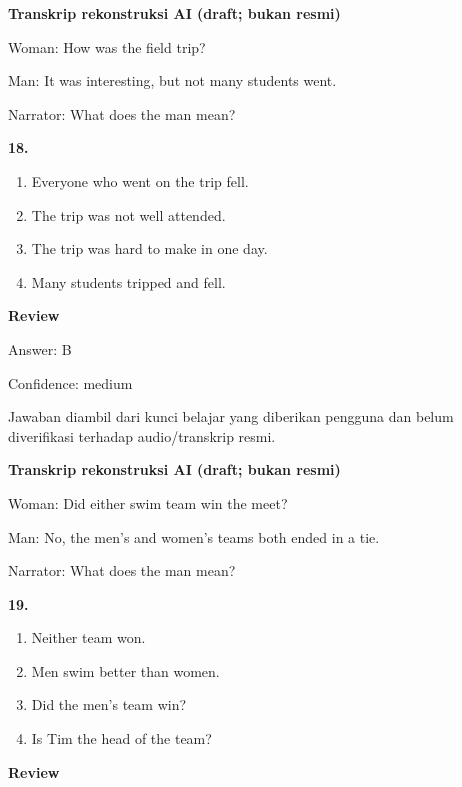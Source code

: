 \documentclass[12pt]{article}
\begin{document}
\begin{exampleblock}
\textbf{Transkrip rekonstruksi AI (draft; bukan resmi)}\par
Woman: How was the field trip?\par
Man: It was interesting, but not many students went.\par
Narrator: What does the man mean?\par
\end{exampleblock}
\noindent\textbf{18.}
\begin{enumerate}[label=(\Alph*),leftmargin=*,itemsep=0.2em]
\item Everyone who went on the trip fell.
\item The trip was not well attended.
\item The trip was hard to make in one day.
\item Many students tripped and fell.
\end{enumerate}
\par
\begingroup
\setlength{\parskip}{0pt}
\setlength{\parindent}{0pt}
\textbf{Review}\par
Answer: B\par
Confidence: medium\par
Jawaban diambil dari kunci belajar yang diberikan pengguna dan belum diverifikasi terhadap audio/transkrip resmi.\par
\endgroup
\par
\vspace{0.25\baselineskip}
\begin{exampleblock}
\textbf{Transkrip rekonstruksi AI (draft; bukan resmi)}\par
Woman: Did either swim team win the meet?\par
Man: No, the men's and women's teams both ended in a tie.\par
Narrator: What does the man mean?\par
\end{exampleblock}
\noindent\textbf{19.}
\begin{enumerate}[label=(\Alph*),leftmargin=*,itemsep=0.2em]
\item Neither team won.
\item Men swim better than women.
\item Did the men's team win?
\item Is Tim the head of the team?
\end{enumerate}
\par
\begingroup
\setlength{\parskip}{0pt}
\setlength{\parindent}{0pt}
\textbf{Review}\par
\end{document}
